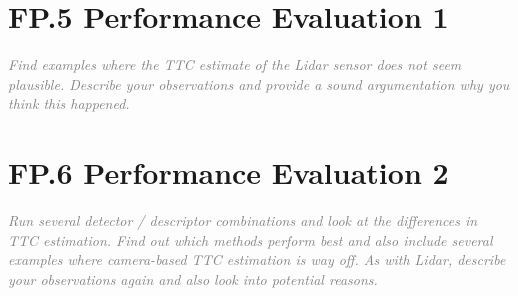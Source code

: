 \documentclass[a4paper]{scrartcl}
\begin{document}
\section*{FP.5 Performance Evaluation 1}
\textcolor{gray}{\textit{Find examples where the TTC estimate of the Lidar sensor does not seem plausible. Describe your observations and provide a sound argumentation why you think this happened.}}

\section*{FP.6 Performance Evaluation 2}
\textcolor{gray}{\textit{Run several detector / descriptor combinations and look at the differences in TTC estimation. Find out which methods perform best and also include several examples where camera-based TTC estimation is way off. As with Lidar, describe your observations again and also look into potential reasons.}}
\end{document}
